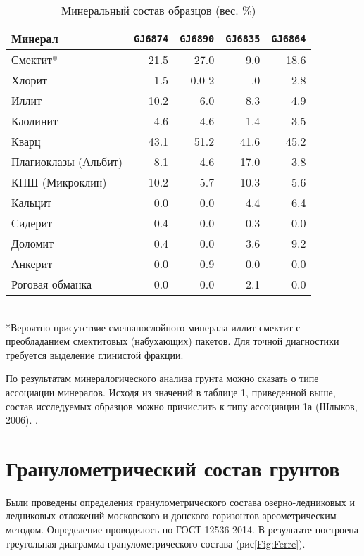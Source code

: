 \begin{table}[]
    \centering
    \small
    \caption{Минеральный состав образцов (вес. \%)} \label{tab:mineral}
    \begin{tabular}{@{}lrrrr@{}}
    \toprule
    Минерал & \texttt{GJ6874} &	\texttt{GJ6890} & \texttt{GJ6835} & \texttt{GJ6864}  \\ \midrule
    Смектит*	& 21.5	& 27.0	& 9.0	& 18.6 \\
    Хлорит	& 1.5	& 0.0	2& .0	& 2.8 \\
    Иллит	& 10.2	& 6.0	& 8.3	& 4.9 \\
    Каолинит	& 4.6	& 4.6	& 1.4	& 3.5 \\
    Кварц	& 43.1	& 51.2	& 41.6	& 45.2 \\
    Плагиоклазы (Альбит)	& 8.1	& 4.6	& 17.0	& 3.8 \\
    КПШ (Микроклин)	& 10.2	& 5.7	& 10.3	& 5.6 \\
    Кальцит	& 0.0	& 0.0	& 4.4	& 6.4 \\
    Сидерит	& 0.4	& 0.0	& 0.3	& 0.0 \\
    Доломит	& 0.4	& 0.0	& 3.6	& 9.2 \\
    Анкерит	& 0.0	& 0.9	& 0.0	& 0.0 \\
    Роговая обманка	& 0.0	& 0.0	& 2.1	& 0.0 \\ \bottomrule
    \end{tabular}
    \\ *Вероятно присутствие смешанослойного минерала иллит-смектит с преобладанием смектитовых (набухающих) пакетов. Для точной диагностики требуется выделение глинистой фракции.
\end{table}
	
По результатам минералогического анализа грунта можно сказать о типе ассоциации минералов. Исходя из значений в таблице 1, приведенной выше, состав исследуемых образцов можно причислить к типу ассоциации 1а (Шлыков, 2006). \cite{Sh_2006}.


\section{Гранулометрический состав грунтов}

Были проведены определения гранулометрического состава озерно-ледниковых и ледниковых отложений московского и донского горизонтов ареометрическим методом. Определение проводилось по ГОСТ 12536-2014. В результате построена треугольная диаграмма гранулометрического состава (рис\ref{Fig:Ferre}).

